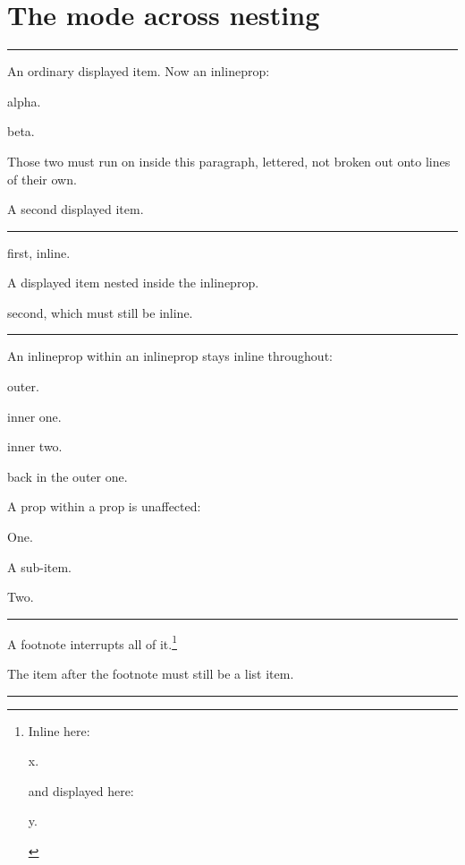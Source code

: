 \documentclass{article}
\begin{document}
\section{The mode across nesting}

\noindent\rule{\textwidth}{0.3pt}
\begin{prop}
  \item An ordinary displayed item. \label{m:1}
  Now an inlineprop: \begin{inlineprop}\item alpha. \item beta.\end{inlineprop}
  Those two must run on inside this paragraph, lettered, not broken out onto
  lines of their own.
  \item A second displayed item. \label{m:2}
\end{prop}
\noindent\rule{\textwidth}{0.3pt}

\begin{inlineprop}
  \item first, inline. \label{m:3}
  \begin{prop}\item A displayed item nested inside the inlineprop.\end{prop}
  \item second, which must still be inline. \label{m:4}
\end{inlineprop}

\noindent\rule{\textwidth}{0.3pt}

An inlineprop within an inlineprop stays inline throughout:
\begin{inlineprop}\item outer. \begin{inlineprop}\item inner one.
\item inner two.\end{inlineprop} back in the outer one.\end{inlineprop}

A prop within a prop is unaffected:
\begin{prop}
  \item One.
  \begin{prop}\item A sub-item.\end{prop}
  \item Two.
\end{prop}
\noindent\rule{\textwidth}{0.3pt}

A footnote interrupts all of it.\footnote{Inline here:
\begin{inlineprop}\item x.\end{inlineprop} and displayed here:
\begin{prop}\item y.\end{prop}}
\begin{prop}
  \item The item after the footnote must still be a list item.
\end{prop}
\noindent\rule{\textwidth}{0.3pt}
\end{document}
